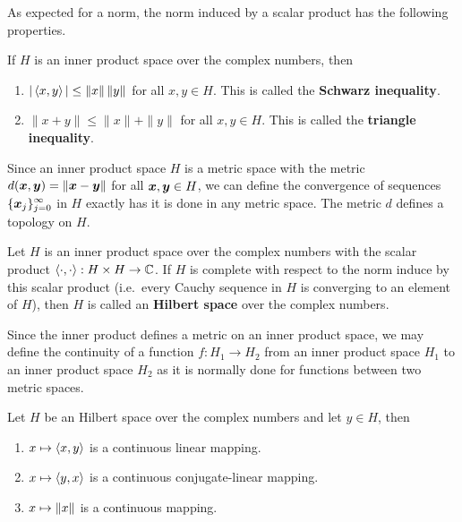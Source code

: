 As expected for a norm, the norm induced by a scalar product has the
following properties.

\begin{theorem}
If $H$ is an inner product space over the complex numbers, then
\begin{enumerate}
\item $|\left\langle{x} , {y}\right\rangle| \leq \|x\|\,\|y\|$ for all $x,y\in H$.  This is
called the {\bfseries Schwarz inequality}.
\item $\|x+y\| \leq \|x\| + \|y\|$ for all $x,y\in H$.  This is
called the {\bfseries triangle inequality}.
\end{enumerate}
\end{theorem}

Since an inner product space $H$ is a metric space with the metric
$d({\bm{x}},{\bm{y}}) = \|{\bm{x}} - {\bm{y}}\|$ for all ${\bm{x}},{\bm{y}} \in H$,
we can define the convergence of sequences
$\displaystyle \{ {\bm{x}}_j \}_{j=0}^\infty$ in $H$ exactly has it is
done in any metric space.  The metric $d$ defines a topology on $H$.

\begin{defn}
Let $H$ is an inner product space over the complex numbers with the
scalar product $\left\langle{\cdot} , {\cdot}\right\rangle:H\times H \rightarrow \mathbb{C}$.  If $H$
is complete with respect to the norm induce by this scalar product
(i.e.\ every Cauchy sequence in $H$ is converging to an element of
$H$), then $H$ is called an
{\bfseries Hilbert space} over the complex
numbers.
\end{defn}

Since the inner product defines a metric on an inner product space, we
may define the continuity of a function $f:H_1 \to H_2$ from an inner
product space $H_1$ to an inner product space $H_2$ as it is normally
done for functions between two metric spaces.

\begin{prop}
Let $H$ be an Hilbert space over the complex numbers and let
$y\in H$, then
\begin{enumerate}
\item $\displaystyle x \mapsto \left\langle{x} , {y}\right\rangle$ is a continuous linear mapping.
\item $\displaystyle x \mapsto \left\langle{y} , {x}\right\rangle$ is a continuous
conjugate-linear mapping.
\item $\displaystyle x \mapsto \|x\|$ is a continuous mapping.
\end{enumerate}
\end{prop}

